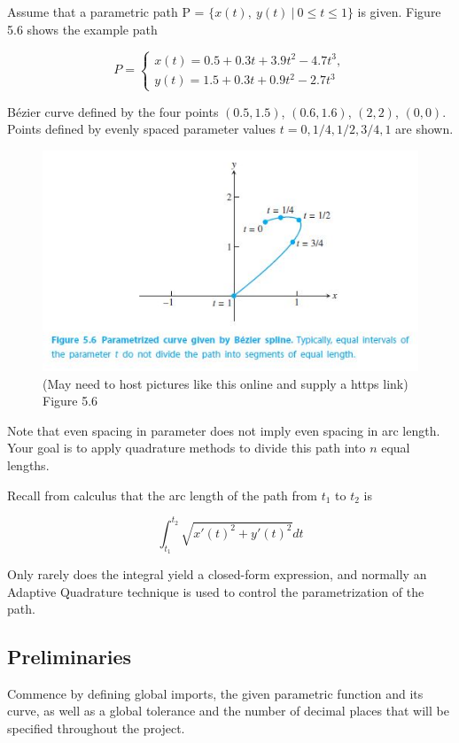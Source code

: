\documentclass[11pt]{article}
\makeatletter
\def\maxwidth{\ifdim\Gin@nat@width>\linewidth\linewidth
    \else\Gin@nat@width\fi}
\let\Oldincludegraphics\includegraphics
\renewcommand{\includegraphics}[1]{\Oldincludegraphics[width=.8\maxwidth]{#1}}
\makeatother
\begin{document}
Assume that a parametric path P =
\(\{x(t),\ y(t) \ | \  0 \leq t \leq 1\}\) is given. Figure 5.6 shows
the example path

\[
P =
\begin{cases}
x(t) = 0.5 + 0.3t + 3.9t^2 − 4.7t^3, \\
y(t) = 1.5 + 0.3t + 0.9t^2 − 2.7t^3
\end{cases}
\]

Bézier curve defined by the four points \((0.5,1.5)\), \((0.6,1.6)\),
\((2,2)\), \((0,0)\). Points defined by evenly spaced parameter values
\(t = 0, 1/4, 1/2, 3/4, 1\) are shown.

\begin{figure}
\centering
\includegraphics{img/Figure5_6.JPG}
\caption{(May need to host pictures like this online and supply a https
link) Figure 5.6}
\end{figure}

Note that even spacing in parameter does not imply even spacing in arc
length. Your goal is to apply quadrature methods to divide this path
into \(n\) equal lengths.

Recall from calculus that the arc length of the path from \(t_1\) to
\(t_2\) is

\[
\int_{t_1}^{t_2} \sqrt{x'(t)^2+y'(t)^2}dt
\]

Only rarely does the integral yield a closed-form expression, and
normally an Adaptive Quadrature technique is used to control the
parametrization of the path.

    \subsection{Preliminaries}\label{preliminaries}

Commence by defining global imports, the given parametric function and
its curve, as well as a global tolerance and the number of decimal
places that will be specified throughout the project.
\end{document}
